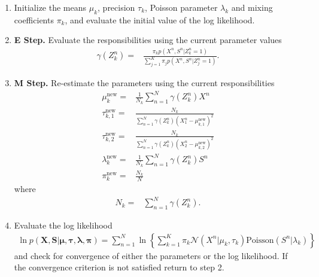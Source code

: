 \documentclass[11pt]{extarticle}
\newcommand{\N}{\mathcal{N}}
\newcommand{\X}{\mathbf{X}}
\newcommand{\0}{\mathbf{0}}
\renewcommand{\(}{\left(}
\renewcommand{\)}{\right)}
\theoremstyle{definition}
\begin{document}
\begin{enumerate}
	\item Initialize the means $\mu_{k}$, precision $\tau_{k}$, Poisson parameter $\lambda_{k}$ and mixing coefficients $\pi_{k}$, and evaluate the initial value of the log likelihood.
	\item \textbf{E Step.} Evaluate the responsibilities using the current parameter values
	\begin{align*}
		\gamma(Z^{n}_{k}) =& \frac{\pi_{k} p(X^{n}, S^{n} \vert Z^{n}_{k} = 1)}{\sum_{j=1}^{K}\pi_{j} p(X^{n}, S^{n} \vert Z^{n}_{j}=1)}.
	\end{align*}
	\item \textbf{M Step.} Re-estimate the parameters using the current responsibilities
	\begin{align*}
		\mu_{k}^{\mathrm{new}} =& \frac{1}{N_{k}} \sum_{n=1}^{N} \gamma(Z^{n}_{k}) X^{n} \\
		\tau_{k,1}^{\mathrm{new}} =& \frac{N_{k}}{\sum_{n=1}^{N} \gamma(Z^{n}_{k}) (X^{n}_{1} - \mu_{k,1}^{\mathrm{new}})^{2}} \\
		\tau_{k,2}^{\mathrm{new}} =& \frac{N_{k}}{\sum_{n=1}^{N} \gamma(Z^{n}_{k}) (X^{n}_{2} - \mu_{k,2}^{\mathrm{new}})^{2}} \\
		\lambda_{k}^{\mathrm{new}} =& \frac{1}{N_{k}} \sum_{n=1}^{N} \gamma(Z^{n}_{k}) S^{n} \\
		\pi_{k}^{\mathrm{new}} =& \frac{N_{k}}{N}
	\end{align*}
	where
	\begin{align*}
		N_{k} =& \sum_{n=1}^{N} \gamma(Z^{n}_{k}).
	\end{align*}
	\item Evaluate the log likelihood
	\begin{align*}
		\ln p(\X, \mathbf{S} \vert \bm{\mu}, \bm{\tau}, \bm{\lambda}, \bm{\pi}) = \sum_{n=1}^{N} \ln\left\{ \sum_{k=1}^{K} \pi_{k}\N(X^{n} \vert \mu_{k}, \tau_{k})\mathrm{Poisson}(S^{n} \vert \lambda_{k}) \right\}
	\end{align*}
	and check for convergence of either the parameters or the log likelihood. If the convergence criterion is not satisfied return to step 2.
\end{enumerate}
\end{document}
